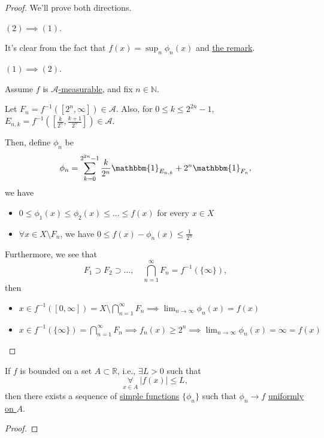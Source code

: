 \begin{proof}
	We'll prove both directions.
	\begin{claim}
		\((2)\implies (1)\).
	\end{claim}
	\begin{explanation}
		It's clear from the fact that \(f(x) = \sup_n \phi _{n}(x)\) and \hyperref[rmk:Operations-preserve-measurability]{the remark}.
	\end{explanation}

	\begin{claim}
		\((1)\implies (2)\).
	\end{claim}
	\begin{explanation}
		Assume \(f\) is \hyperref[def:A-measurable-function]{\(\mathcal{A} \)-measurable}, and fix \(n\in\mathbb{N} \).

		\par Let \(F_{n} =f^{-1} ([2^n, \infty ])\in \mathcal{A}\). Also, for \(0\leq k\leq 2^{2n}-1\), \(E_{n, k} = f^{-1} \left(\left[\frac{k}{2^n}, \frac{k+1}{2^n}\right]\right)\in \mathcal{A} \).

		\par Then, define \(\phi _{n}\) be
		\[
			\phi _{n} = \sum_{k=0}^{2^{2n} - 1}\frac{k}{2^n}\mathbbm{1}_{E_{n, k}}  + 2^n \mathbbm{1}_{F_n},
		\]
		we have
		\begin{itemize}
			\item \(0\leq \phi _1(x)\leq \phi _2(x)\leq \dots \leq f(x) \) for every \(x\in X\)
			\item \(\forall x\in X\setminus F_{n}\), we have \(0\leq f(x) - \phi _{n}(x)\leq \frac{1}{2^n}\)
		\end{itemize}

		\par Furthermore, we see that
		\[
			F_1\supset F_2\supset \dots ,\quad \bigcap_{n=1}^{\infty} F_{n} = f^{-1} (\{\infty \}),
		\]
		then
		\begin{itemize}
			\item \(x\in f^{-1} ([0, \infty ]) = X\setminus \bigcap_{n=1}^{\infty} F_{n} \implies \lim_{n \to \infty} \phi _{n}(x) = f(x)\)
			\item \(x\in f^{-1} (\{\infty \}) = \bigcap_{n=1}^{\infty} F_{n}\implies f_{n}(x)\geq 2^n \implies \lim_{n \to \infty} \phi _{n}(x) = \infty = f(x)\)
		\end{itemize}
	\end{explanation}
\end{proof}

\begin{corollary}
	If \(f\) is bounded on a set \(A\subset \mathbb{R} \), i.e., \(\exists L > 0 \) such that
	\[
		\underset{x\in A}{\forall }\ \left\vert f(x) \right\vert \leq L,
	\]
	then there exists a sequence of \hyperref[def:simple-function]{simple functions} \(\{\phi _{n}\}\) such that \(\phi _{n}\to f \)
	\underline{\hyperref[def:uniformly-convergence]{uniformly} on \(A\)}.
\end{corollary}
\begin{proof}
\end{proof}

